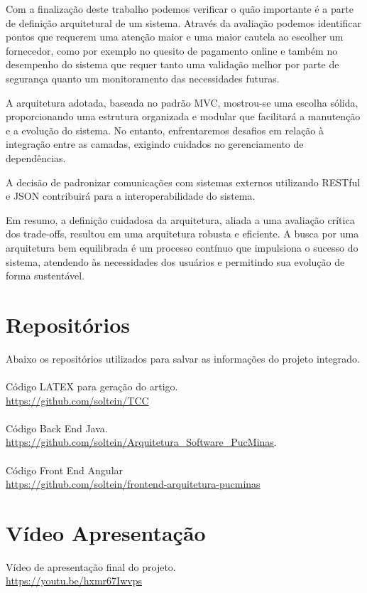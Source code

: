  Com a finalização deste trabalho podemos verificar o quão importante é a parte de definição arquitetural de um sistema. Através da avaliação 
 podemos identificar pontos que requerem uma atenção maior e uma maior cautela ao escolher um fornecedor, como por exemplo no quesito de pagamento online 
 e também no desempenho do sistema que requer tanto uma validação melhor por parte de segurança quanto um monitoramento das necessidades futuras.

 A arquitetura adotada, baseada no padrão MVC, mostrou-se uma escolha sólida, proporcionando uma 
 estrutura organizada e modular que facilitará a manutenção e a evolução do sistema. No entanto, enfrentaremos
 desafios em relação à integração entre as camadas, exigindo cuidados no gerenciamento de dependências.

 A decisão de padronizar comunicações com sistemas externos utilizando RESTful e JSON contribuirá
 para a interoperabilidade do sistema.

 Em resumo, a definição cuidadosa da arquitetura, aliada a uma avaliação crítica dos trade-offs, resultou em uma 
 arquitetura robusta e eficiente. A busca por uma arquitetura bem equilibrada é um processo contínuo que 
 impulsiona o sucesso do sistema, atendendo às necessidades dos usuários e permitindo sua evolução de 
 forma sustentável.

\chapter{Repositórios}

Abaixo os repositórios utilizados para salvar as informações do projeto integrado.
\\\\
\noindent
Código LATEX para geração do artigo.\\
\href{https://github.com/soltein/TCC}{https://github.com/soltein/TCC}
\\\\
Código Back End Java.\\
\href{https://github.com/soltein/Arquitetura_Software_PucMinas}{\url{https://github.com/soltein/Arquitetura_Software_PucMinas}}.
\\\\
Código Front End Angular\\
\href{https://github.com/soltein/frontend-arquitetura-pucminas}{https://github.com/soltein/frontend-arquitetura-pucminas}

\chapter{Vídeo Apresentação}

Vídeo de apresentação final do projeto. \\

\href{https://youtu.be/hxmr67Iwvps}{https://youtu.be/hxmr67Iwvps}